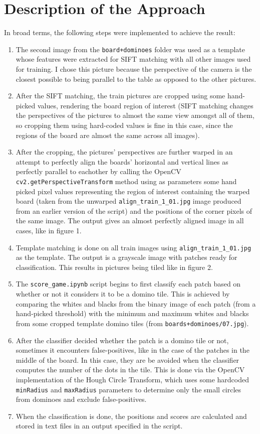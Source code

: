 \documentclass{article}
\begin{document}
\section{Description of the Approach}
In broad terms, the following steps were implemented to achieve the result:
\begin{enumerate}
	\item The second image from the \texttt{board+dominoes} folder was used as a template whose features were extracted for SIFT matching with all other images used for training. I chose this picture because the perspective of the camera is the closest possible to being parallel to the table as opposed to the other pictures.
	\item After the SIFT matching, the train pictures are cropped using some hand-picked values, rendering the board region of interest (SIFT matching changes the perspectives of the pictures to almost the same view amongst all of them, so cropping them using hard-coded values is fine in this case, since the regions of the board are almost the same across all images). 
	\item After the cropping, the pictures' perspectives are further warped in an attempt to perfectly align the boards' horizontal and vertical lines as perfectly parallel to eachother by calling the OpenCV \texttt{cv2.getPerspectiveTransform} method using as parameters some hand picked pixel values representing the region of interest containing the warped board (taken from the unwarped \texttt{align\_train\_1\_01.jpg} image produced from an earlier version of the script) and the positions of the corner pixels of the same image. The output gives an almost perfectly aligned image in all cases, like in figure 1.
	\item Template matching is done on all train images using \texttt{align\_train\_1\_01.jpg} as the template. The output is a grayscale image with patches ready for classification. This results in pictures being tiled like in figure 2.
	\item The \texttt{score\_game.ipynb} script begins to first classify each patch based on whether or not it considers it to be a domino tile. This is achieved by comparing the whites and blacks from the binary image of each patch (from a hand-picked threshold) with the minimum and maximum whites and blacks from some cropped template domino tiles (from \texttt{boards+dominoes/07.jpg}).
	\item After the classifier decided whether the patch is a domino tile or not, sometimes it encounters false-positives, like in the case of the patches in the middle of the board. In this case, they are be avoided when the classifier computes the number of the dots in the tile. This is done via the OpenCV implementation of the Hough Circle Transform, which uses some hardcoded \texttt{minRadius} and \texttt{maxRadius} parameters to determine only the small circles from dominoes and exclude false-positives.
	\item When the classification is done, the positions and scores are calculated and stored in text files in an output specified in the script.
\end{enumerate}
\end{document}
